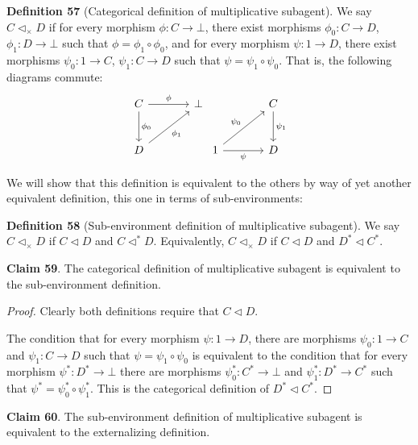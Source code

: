\documentclass{article}
\begin{document}
\noindent \textbf{Definition 57} (Categorical definition of multiplicative subagent).
We say $C \triangleleft_{\times} D$ if for every morphism $\phi: C \to \bot$, there exist morphisms $\phi_0 : C \to D$, $\phi_1 : D \to \bot$ such that $\phi = \phi_1 \circ \phi_0$, and for every morphism $\psi : 1 \to D$, there exist morphisms $\psi_0 : 1 \to C$, $\psi_1 : C \to D$ such that $\psi = \psi_1 \circ \psi_0$.
That is, the following diagrams commute:
\[
 \begin{tikzcd}[row sep=large, column sep=large]
C \arrow[r, "\phi"] \arrow[d, "\phi_0"] & \bot \\ 
D \arrow[ru, "\phi_1", swap]
\end{tikzcd}
\begin{tikzcd}[row sep=large, column sep=large]
                                          & C \arrow[d, "\psi_1"] \\
1 \arrow[r, "\psi"'] \arrow[ru, "\psi_0"] & D                    
\end{tikzcd}
\]

\bigskip
\noindent We will show that this definition is equivalent to the others by way of yet another equivalent definition, this one in terms of sub-environments:

\bigskip
\noindent \textbf{Definition 58} (Sub-environment definition of multiplicative subagent).
We say $C \triangleleft_{\times} D$ if $C \triangleleft D$ and $C \triangleleft^* D$. Equivalently, $C \triangleleft_{\times} D$ if $C \triangleleft D$ and $D^* \triangleleft C^*$.

\bigskip
\noindent \textbf{Claim 59}.
The categorical definition of multiplicative subagent is equivalent to the sub-environment definition.

\begin{proof}
Clearly both definitions require that $C \triangleleft D$.

The condition that for every morphism $\psi: 1 \to D$, there are morphisms $\psi_0 : 1 \to C$ and $\psi_1 : C \to D$ such that $\psi = \psi_1 \circ \psi_0$ is equivalent to the condition that for every morphism $\psi^* : D^* \to \bot$ there are morphisms $\psi^*_0 : C^* \to \bot$ and $\psi^*_1 : D^* \to C^*$ such that $\psi^* = \psi^*_0 \circ \psi^*_1$.
This is the categorical definition of $D^* \triangleleft C^*$.
\end{proof}

\bigskip
\noindent \textbf{Claim 60}.
The sub-environment definition of multiplicative subagent is equivalent to the externalizing definition.
\end{document}
